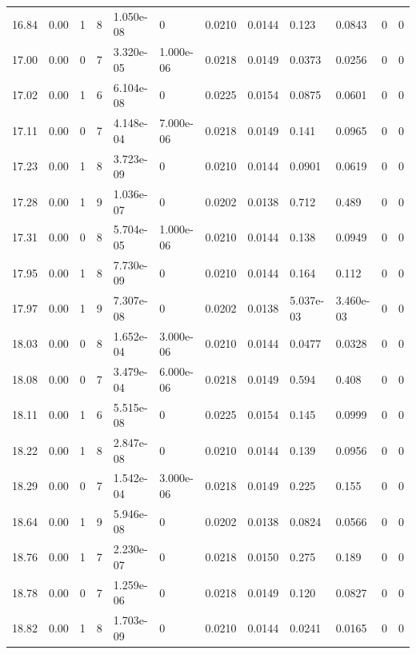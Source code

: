 \documentclass[preview]{standalone}
\begin{document}
{{{{{\begin{tabular}{L{1.2cm}C{1.2cm} C{0.3cm}C{0.5cm} C{1.4cm}C{1.4cm} C{1.4cm}C{1.4cm} C{1.6cm}C{1.6cm} C{1.6cm}C{1.6cm}}
  16.84  &  0.00  & 1     &  8 &  1.050e-08  & 0  &  0.0210&   0.0144& 0.123 & 0.0843   &  0 & 0  \\ 
  17.00  &  0.00  & 0     &  7 &  3.320e-05  & 1.000e-06  &  0.0218&   0.0149& 0.0373 & 0.0256   &  0 & 0  \\ 
  17.02  &  0.00  & 1     &  6 &  6.104e-08  & 0  &  0.0225&   0.0154& 0.0875 & 0.0601   &  0 & 0  \\ 
  17.11  &  0.00  & 0     &  7 &  4.148e-04  & 7.000e-06  &  0.0218&   0.0149& 0.141 & 0.0965   &  0 & 0  \\ 
  17.23  &  0.00  & 1     &  8 &  3.723e-09  & 0  &  0.0210&   0.0144& 0.0901 & 0.0619   &  0 & 0  \\ 
  17.28  &  0.00  & 1     &  9 &  1.036e-07  & 0  &  0.0202&   0.0138& 0.712 & 0.489   &  0 & 0  \\ 
  17.31  &  0.00  & 0     &  8 &  5.704e-05  & 1.000e-06  &  0.0210&   0.0144& 0.138 & 0.0949   &  0 & 0  \\ 
  17.95  &  0.00  & 1     &  8 &  7.730e-09  & 0  &  0.0210&   0.0144& 0.164 & 0.112   &  0 & 0  \\ 
  17.97  &  0.00  & 1     &  9 &  7.307e-08  & 0  &  0.0202&   0.0138& 5.037e-03 & 3.460e-03   &  0 & 0  \\ 
  18.03  &  0.00  & 0     &  8 &  1.652e-04  & 3.000e-06  &  0.0210&   0.0144& 0.0477 & 0.0328   &  0 & 0  \\ 
  18.08  &  0.00  & 0     &  7 &  3.479e-04  & 6.000e-06  &  0.0218&   0.0149& 0.594 & 0.408   &  0 & 0  \\ 
  18.11  &  0.00  & 1     &  6 &  5.515e-08  & 0  &  0.0225&   0.0154& 0.145 & 0.0999   &  0 & 0  \\ 
  18.22  &  0.00  & 1     &  8 &  2.847e-08  & 0  &  0.0210&   0.0144& 0.139 & 0.0956   &  0 & 0  \\ 
  18.29  &  0.00  & 0     &  7 &  1.542e-04  & 3.000e-06  &  0.0218&   0.0149& 0.225 & 0.155   &  0 & 0  \\ 
  18.64  &  0.00  & 1     &  9 &  5.946e-08  & 0  &  0.0202&   0.0138& 0.0824 & 0.0566   &  0 & 0  \\ 
  18.76  &  0.00  & 1     &  7 &  2.230e-07  & 0  &  0.0218&   0.0150& 0.275 & 0.189   &  0 & 0  \\ 
  18.78  &  0.00  & 0     &  7 &  1.259e-06  & 0  &  0.0218&   0.0149& 0.120 & 0.0827   &  0 & 0  \\ 
  18.82  &  0.00  & 1     &  8 &  1.703e-09  & 0  &  0.0210&   0.0144& 0.0241 & 0.0165   &  0 & 0  \\ 

\end{tabular}}}}}}
\end{document}
